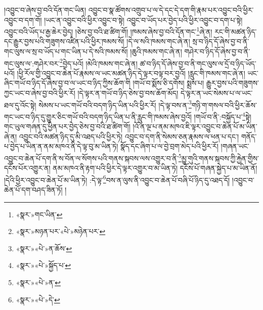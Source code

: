 །འབྱུང་བ་ཞེས་བྱ་བའི་དོན་གང་ཡིན། འབྱུང་བ་སྣ་ཚོགས་འགྲུབ་པ་ལ་དེ་དང་དེ་དག་གི་རྣམ་པར་འབྱུང་བའི་ཕྱིར་འབྱུང་བ་དག་གོ། །ཡང་ན་འབྱུང་བའི་ཕྱིར་འབྱུང་བ་སྟེ། འབྱུང་བ་ཡོད་པར་བྱེད་པའི་ཕྱིར་འབྱུང་བ་དག་པ་སྟེ། འབྱུང་བའི་ཡོད་པ་རྒྱ་ཆེར་བྱེད། །ཅེས་བྱ་བའི་ཐ་ཚིག་གོ། །ཁམས་ཞེས་བྱ་བའི་དོན་གང་\footnote{«སྣར་»གང་ཡིན་}ཞེ་ན། རང་གི་མཚན་ཉིད་དང་རྒྱུར་བྱས་པའི་གཟུགས་འཛིན་པའི་ཕྱིར་ཁམས་སོ། །དེ་ལ་སའི་ཁམས་གང་ཞེ་ན། སྲ་བ་ཉིད་དོ་ཞེས་བྱ་བ་ནི་གང་ལུས་ལ་སྲ་བ་ཡོད་པ་གང་ཡིན་པ་དེ་སའི་ཁམས་སོ། །ཆུའི་ཁམས་གང་ཞེ་ན། གཤེར་བ་ཉིད་དོ་ཞེས་བྱ་བ་ནི་གང་ལུས་ལ་:གཤེར་བར་\footnote{«སྣར་»མཉན་པར་«པེ་»མཉེན་པར་}བྱེད་པའོ། །མེའི་ཁམས་གང་ཞེ་ན། ཚ་བ་ཉིད་དོ་ཞེས་བྱ་བ་ནི་གང་ལུས་ལ་དྲོ་བ་ཉིད་ཡོད་པའོ། །ཕྱི་རོལ་གྱི་འབྱུང་བ་ཆེན་པོ་རྣམས་ལ་ཡང་མཚན་ཉིད་དེ་ལྟར་བལྟ་བར་བྱའོ། །རླུང་གི་ཁམས་གང་ཞེ་ན། ཡང་ཞིང་གཡོ་བ་ཉིད་དོ་ཞེས་བྱ་བ་ལ་ཡང་བ་ཉིད་ཀྱིས་ཆོག་གི །གཡོ་བ་སྨོས་ཅི་དགོས། སྨྲས་པ། རྒྱུར་བྱས་པའི་གཟུགས་ཀྱང་ཡང་བ་ཞེས་བྱ་བའི་ཕྱིར་རོ། །དེ་ལྟར་ན་གཡོ་བ་ཉིད་ཅེས་བྱ་བས་ཆོག་མོད། དེ་ལྟར་ན་ཡང་སེམས་པ་ལ་ཡང་ཐལ་དུ་འོང་སྟེ། སེམས་པ་ཡང་གཡོ་བའི་བདག་ཉིད་ཡིན་པའི་ཕྱིར་རོ། །དེ་ལྟ་བས་ན་\footnote{«སྣར་»«པེ་»ན་ཆོས་}གཉི་ག་གསལ་བའི་ཕྱིར་ཆོས་གང་ཡང་བ་ཉིད་དུ་གྱུར་ཅིང་གཡོ་བའི་བདག་ཉིད་ཡིན་པ་ནི་རླུང་གི་ཁམས་ཞེས་བྱའོ། །གཡོ་བ་ནི་:བསྐྱོད་པ་\footnote{«སྣར་»«པེ་»སྐྱོད་པ་}སྟེ། གང་ཡུལ་གཞན་དུ་ཕྱིན་པར་བྱེད་ཅེས་བྱ་བའི་ཐ་ཚིག་གོ། །འོ་ན་ལྔ་པ་ནམ་མཁའ་ཇི་ལྟར་འབྱུང་བ་ཆེན་པོ་མ་ཡིན་ཞེ་ན། འབྱུང་བའི་མཚན་ཉིད་དུ་མི་འཐད་པའི་ཕྱིར་ཏེ། འབྱུང་བ་དག་ནི་སེམས་ཅན་རྣམས་ལ་ཕན་པ་དང་། གནོད་པ་བྱེད་པ་ཡིན་ན་ནམ་མཁའ་ནི་དེ་ལྟ་བུ་མ་ཡིན་ཏེ། སྣོད་དང་ཞིག་པ་ལ་བྱེ་བྲག་མེད་པའི་ཕྱིར་རོ། །གཞན་ཡང་འབྱུང་བ་ཆེན་པོ་དག་ནི་ས་བོན་ལ་སོགས་པའི་གནས་སྐབས་ལས་འགྱུར་བ་ནི་\footnote{«སྣར་»«པེ་»ན་}མྱུ་གུའི་གནས་སྐབས་ཀྱི་རྐྱེན་གྱིས་དངོས་པོར་འགྱུར་ན། ནམ་མཁའ་ནི་རྟག་པའི་ཕྱིར་དེ་ལྟར་འགྱུར་བ་མ་ཡིན་ཏེ། དངོས་པོ་གཞན་སྐྱེད་པ་མ་ཡིན་ནོ། །དེའི་ཕྱིར་འབྱུང་བ་ཆེན་པོ་མ་ཡིན་ཏེ། :དེ་ལྟ་\footnote{«སྣར་»«པེ་»དེ་}བས་ན་ལུས་ནི་འབྱུང་བ་ཆེན་པོ་བཞི་པོ་ཉིད་དུ་འཐད་དོ། །འབྱུང་བ་ཆེན་པོ་དག་བཤད་ཟིན་ཏོ། །
